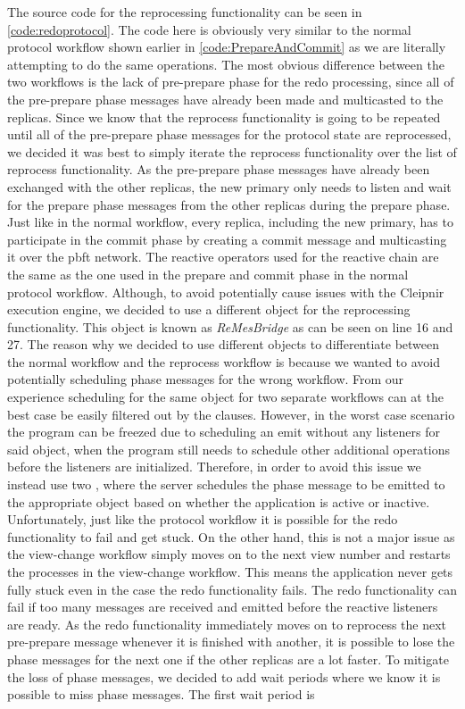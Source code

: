 The source code for the reprocessing functionality can be seen in \autoref{code:redoprotocol}. The code here is obviously very similar to the normal protocol workflow shown earlier in \autoref{code:PrepareAndCommit} as we are literally attempting to do the same operations. The most obvious difference between the two workflows is the lack of pre-prepare phase for the redo processing, since all of the pre-prepare phase messages have already been made and multicasted to the replicas. Since we know that the reprocess functionality is going to be repeated until all of the pre-prepare phase messages for the protocol state are reprocessed, we decided it was best to simply iterate the reprocess functionality over the list of reprocess functionality. As the pre-prepare phase messages have already been exchanged with the other replicas, the new primary only needs to listen and wait for the prepare phase messages from the other replicas during the prepare phase. Just like in the normal workflow, every replica, including the new primary, has to participate in the commit phase by creating a commit message and multicasting it over the \ac{pbft} network. The reactive operators used for the reactive chain are the same as the one used in the prepare and commit phase in the normal protocol workflow. Although, to avoid potentially cause issues with the Cleipnir execution engine, we decided to use a different  object for the reprocessing functionality. This  object is known as \emph{ReMesBridge} as can be seen on line 16 and 27. The reason why we decided to use different  objects to differentiate between the normal workflow and the reprocess workflow is because we wanted to avoid potentially scheduling phase messages for the wrong workflow. From our experience scheduling for the same  object for two separate workflows can at the best case be easily filtered out by the  clauses. However, in the worst case scenario the program can be freezed due to scheduling an emit without any listeners for said  object, when the program still needs to schedule other additional operations before the listeners are initialized. Therefore, in order to avoid this issue we instead use two , where the server schedules the phase message to be emitted to the appropriate  object based on whether the application is active or inactive. Unfortunately, just like the protocol workflow it is possible for the redo functionality to fail and get stuck. On the other hand, this is not a major issue as the view-change workflow simply moves on to the next view number and restarts the processes in the view-change workflow. This means the application never gets fully stuck even in the case the redo functionality fails. The redo functionality can fail if too many messages are received and emitted before the reactive listeners are ready. As the redo functionality immediately moves on to reprocess the next pre-prepare message whenever it is finished with another, it is possible to lose the phase messages for the next one if the other replicas are a lot faster. To mitigate the loss of phase messages, we decided to add wait periods where we know it is possible to miss phase messages. The first wait period is 